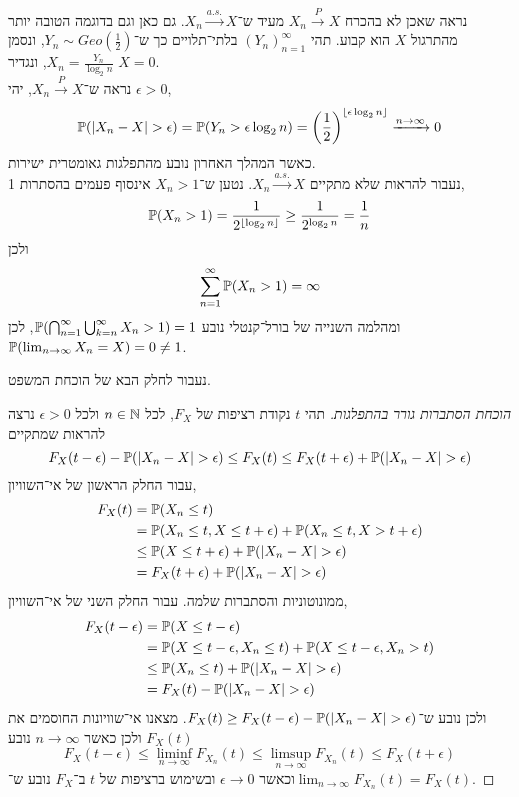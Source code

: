 \begin{example}
	נראה שאכן לא בהכרח $X_n \xrightarrow{P} X$ מעיד ש־$X_n \xrightarrow{a.s.} X$.
	גם כאן וגם בדוגמה הטובה יותר מהתרגול $X$ הוא קבוע.
	תהי ${(Y_n)}_{n = 1}^\infty$ בלתי־תלויים כך ש־$Y_n \sim Geo(\frac{1}{2})$, ונסמן $X_n = \frac{Y_n}{\log_2 n}$, ונגדיר $X = 0$. \\
	נראה ש־$X_n \xrightarrow{P} X$,
	יהי $\epsilon > 0$,
	\[
		\mathbb{P}(|X_n - X| > \epsilon)
		= \mathbb{P}(Y_n > \epsilon \log_2 n)
		= {\left(\frac{1}{2}\right)}^{\lfloor \epsilon \log_2 n \rfloor}
		\xrightarrow{n \to \infty} 0
	\]
	כאשר המהלך האחרון נובע מהתפלגות גאומטרית ישירות. \\
	נעבור להראות שלא מתקיים $X_n \xrightarrow{a.s.} X$.
	נטען ש־$X_n > 1$ אינסוף פעמים בהסתרות 1,
	\[
		\mathbb{P}(X_n > 1)
		= \frac{1}{2^{\lfloor \log_2 n \rfloor}}
		\ge \frac{1}{2^{\log_2 n}}
		= \frac{1}{n}
	\]
	ולכן
	\[
		\sum_{n = 1}^{\infty} \mathbb{P}(X_n > 1) = \infty
	\]
	ומהלמה השנייה של בורל־קנטלי נובע $\mathbb{P}(\bigcap_{n = 1}^\infty \bigcup_{k = n}^\infty X_n > 1) = 1$,
	לכן $\mathbb{P}(\lim_{n \to \infty} X_n = X) = 0 \ne 1$.
\end{example}
נעבור לחלק הבא של הוכחת המשפט.
\begin{proof}[הוכחת הסתברות גורר בהתפלגות]
	תהי $t$ נקודת רציפות של $F_X$, לכל $n \in \mathbb{N}$ ולכל $\epsilon > 0$ נרצה להראות שמתקיים
	\[
		F_X(t - \epsilon) - \mathbb{P}(|X_n - X| > \epsilon)
		\le F_X(t)
		\le F_X(t + \epsilon) + \mathbb{P}(|X_n - X| > \epsilon)
	\]
	עבור החלק הראשון של אי־השוויון,
	\begin{align*}
		F_X(t)
		& = \mathbb{P}(X_n \le t) \\
		& = \mathbb{P}(X_n \le t, X \le t + \epsilon) + \mathbb{P}(X_n \le t, X > t + \epsilon) \\
		& \le \mathbb{P}(X \le t + \epsilon) + \mathbb{P}(|X_n - X| > \epsilon) \\
		& = F_X(t + \epsilon) + \mathbb{P}(|X_n - X| > \epsilon)
	\end{align*}
	ממונוטוניות והסתברות שלמה.
	עבור החלק השני של אי־השוויון,
	\begin{align*}
		F_X(t - \epsilon)
		& = \mathbb{P}(X \le t - \epsilon) \\
		& = \mathbb{P}(X \le t - \epsilon, X_n \le t) + \mathbb{P}(X \le t - \epsilon, X_n > t) \\
		& \le \mathbb{P}(X_n \le t) + \mathbb{P}(|X_n - X| > \epsilon) \\
		& = F_X(t) - \mathbb{P}(|X_n - X| > \epsilon)
	\end{align*}
	ולכן נובע ש־$F_X(t) \ge F_X(t - \epsilon) - \mathbb{P}(|X_n - X| > \epsilon)$.
	מצאנו אי־שוויונות החוסמים את $F_X(t)$ ולכן כאשר $n \to \infty$ נובע
	\[
		F_X(t - \epsilon)
		\le \liminf_{n \to \infty} F_{X_n}(t)
		\le \limsup_{n \to \infty} F_{X_n}(t)
		\le F_X(t + \epsilon)
	\]
	וכאשר $\epsilon \to 0$ ובשימוש ברציפות של $t$ ב־$F_X$ נובע ש־$\lim_{n \to \infty} F_{X_n}(t) = F_X(t)$.
\end{proof}
